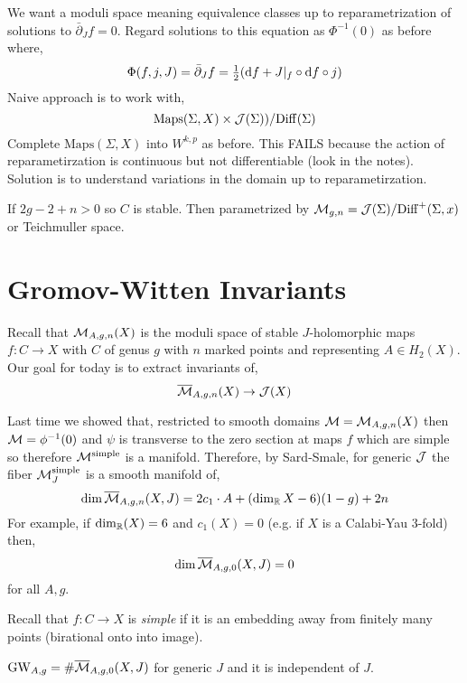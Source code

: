 \documentclass[12pt]{article}
\newcommand{\dbar}{\bar{\partial}}
\begin{document}
We want a moduli space meaning equivalence classes up to reparametrization of solutions to $\dbar_J f = 0$. Regard solutions to this equation as $\Phi^{-1}(0)$ as before where,
\[ \Phi(f, j, J) = \dbar_J f = \tfrac{1}{2} (\d{f} + J|_f \circ \d{f} \circ j) \]
Naive approach is to work with,
\[ \mathrm{Maps}(\Sigma, X) \times \mathcal{J}(\Sigma)) / \mathrm{Diff}(\Sigma) \]
Complete $\mathrm{Maps}(\Sigma, X)$ into $W^{k,p}$ as before. This FAILS because the action of reparametirzation is continuous but not differentiable (look in the notes).
\bigskip\\
Solution is to understand variations in the domain up to reparametirzation. 

\begin{example}
If $2g - 2 +n > 0$ so $C$ is stable. Then parametrized by $\mathcal{M}_{g,n} = \mathcal{J}(\Sigma) / \mathrm{Diff}^+(\Sigma, x)$ or Teichmuller space.
\end{example}

\section{Gromov-Witten Invariants}

Recall that $\mathcal{M}_{A,g,n}(X)$ is the moduli space of stable $J$-holomorphic maps $f : C \to X$ with $C$ of genus $g$ with $n$ marked points and representing $A \in H_2(X)$. Our goal for today is to extract invariants of,
\[ \overline{\mathcal{M}}_{A,g,n}(X) \to \mathcal{J}(X) \]

Last time we showed that, restricted to smooth domains $\mathcal{M} = \mathcal{M}_{A,g,n}(X)$ then $\mathcal{M} = \phi^{-1}(0)$ and $\psi$ is transverse to the zero section at maps $f$ which are simple so therefore $\mathcal{M}^{\text{simple}}$ is a manifold. Therefore, by Sard-Smale, for generic $\mathcal{J}$ the fiber $\mathcal{M}_J^{\text{simple}}$ is a smooth manifold of,
\[ \dim{\overline{\mathcal{M}}_{A,g,n}(X,J)} = 2 c_1 \cdot A + (\dim_{\mathbb{R}}{X} - 6)(1 - g) + 2 n \]
For example, if $\dim_{\mathbb{R}}(X) = 6$ and $c_1(X) = 0$ (e.g. if $X$ is a Calabi-Yau 3-fold) then,
\[ \dim{\overline{\mathcal{M}}_{A,g,0}}(X, J) = 0 \]
for all $A,g$. 

\begin{rmk}
Recall that $f : C \to X$ is \textit{simple} if it is an embedding away from finitely many points (birational onto into image). 
\end{rmk}

\newcommand{\GW}{\mathrm{GW}}

\begin{defn}
$\GW_{A,g} = \# \Mbar_{A,g,0}(X,J)$ for generic $J$ and it is independent of $J$. 
\end{defn}
\end{document}
